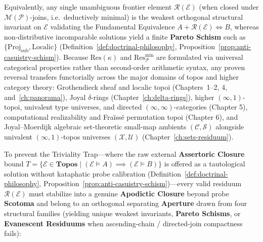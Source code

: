 \documentclass[10pt,twoside,openright]{book}
\theoremstyle{crmplain}
\theoremstyle{crmdef}
\theoremstyle{crmremark}
\begin{document}
Equivalently, any single unambiguous frontier element $\mathcal{R}(\mathcal{E})$ (when closed under $\mathcal{M}(\mathcal{P})$-joins, i.e.\ deductively minimal) is the weakest orthogonal structural invariant on $\mathcal{E}$ validating the Fundamental Equivalence $A + \mathcal{R}(\mathcal{E}) \iff B$, whereas non-distributive incomparable solutions yield a finite \textbf{Pareto Schism} such as $\{\mathrm{Proj}_{\mathrm{sub}}, \mathrm{Localic}\}$ (Definition~\ref{def:doctrinal-philosophy}, Proposition~\ref{prop:anti-casuistry-schism}). Because $\mathrm{Res}(\kappa)$ and $\mathrm{Res}_{\mathcal{P}}^{\min}$ are formulated via universal categorical properties rather than second-order arithmetic syntax, any proven reversal transfers functorially across the major domains of topos and higher category theory: Grothendieck sheaf and localic topoi (Chapters~1--2, 4, and~\ref{ch:panorama}), Joyal $\delta$-rings (Chapter~\ref{ch:delta-rings}), higher $(\infty, 1)$-topoi, univalent type universes, and directed $(\infty, \infty)$-categories (Chapter 5), computational realizability and Fraïssé permutation topoi (Chapter 6), and Joyal--Moerdijk algebraic set-theoretic small-map ambients $(\mathcal{C}, \mathcal{S})$ alongside univalent $(\infty, 1)$-topos universes $(\mathcal{X}, \mathcal{U})$ (Chapter~\ref{ch:sets-residuum}).

To prevent the Triviality Trap---where the raw external \textbf{Assertoric Closure} bound $T = \{\mathcal{E} \in \mathbf{Topos} \mid (\mathcal{E} \models A) \implies (\mathcal{E} \models B)\}$ is offered as a tautological solution without kataphatic probe calibration (Definition~\ref{def:doctrinal-philosophy}, Proposition~\ref{prop:anti-casuistry-schism})---every valid residuum $\mathcal{R}(\mathcal{E})$ must stabilize into a genuine \textbf{Apodictic Closure} beyond probe \textbf{Scotoma} and belong to an orthogonal separating \textbf{Aperture} drawn from four structural families (yielding unique weakest invariants, \textbf{Pareto Schisms}, or \textbf{Evanescent Residuums} when ascending-chain / directed-join compactness fails):
\end{document}
